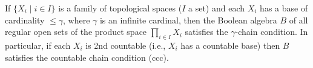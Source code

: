 If $\{X_i \mid i \in I\}$ is a family of topological spaces ($I$ a set) and each $X_i$ has a base of cardinality $\leq \gamma$, where $\gamma$ is an infinite cardinal, then the Boolean algebra $B$ of all regular open sets of the product space $\prod_{i \in I} X_i$ satisfies the $\gamma$-chain condition.
In particular, if each $X_i$ is 2nd countable (i.e., $X_i$ has a countable base) then $B$ satisfies the countable chain condition (ccc).

